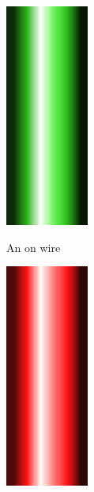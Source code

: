 \documentclass[12pt]{book}
\begin{document}
			\begin{figure}[h]
				\centering
				\begin{subfigure}[t]{0.3\textwidth}
					\centering
					\includegraphics[width=0.3\textwidth]{ON}

					An on wire
				\end{subfigure}
				\hspace{1mm}
				\begin{subfigure}[t]{0.3\textwidth}
					\centering
					\includegraphics[width=0.3\textwidth]{OFF}


\end{subfigure}
\end{figure}
\end{document}
